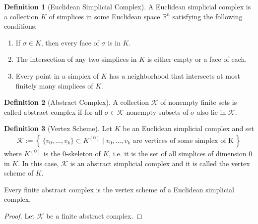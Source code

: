 \documentclass[a4paper]{book}
\theoremstyle{definition}
\newtheorem{definition}{Definition}[]
\newcommand{\makeset}[2]{\left\{\, #1 \mid #2 \,\right\}}
\begin{document}
\begin{defbox}
    \begin{definition}[Euclidean Simplicial Complex]
        A Euclidean simplicial complex is a collection \(K\) of simplices in some Euclidean space \(\mathbb{R}^n\) satisfying the following conditions:
        \begin{enumerate}
            \item If \(\sigma \in K\), then every face of \(\sigma\) is in \(K\).
            \item The intersection of any two simplices in \(K\) is either empty or a face of each.
            \item Every point in a simplex of \(K\) has a neighborhood that intersects at most finitely many simplices of \(K\).
        \end{enumerate}
    \end{definition}
\end{defbox}

\begin{defbox}
    \begin{definition}[Abstract Complex]
        A collection \(\mathcal{K}\) of nonempty finite sets is called abstract complex if for all \(\sigma \in \mathcal{K}\) nonempty subsets of \(\sigma\) also lie in \(\mathcal{K}\).
    \end{definition}
\end{defbox}

\begin{defbox}
    \begin{definition}[Vertex Scheme]
        Let \(K\) be an Euclidean simplicial complex and set
        \begin{align*}
            \mathcal{K} := \makeset{\{v_0, \ldots, v_k\} \subset K^{(0)}}{v_0, \ldots, v_k \text{ are vertices of some simplex of K}}
        \end{align*}
        where \(K^{(0)}\) is the \(0\)-skeleton of \(K\), i.e. it is the set of all simplices of dimension \(0\) in \(K\). In this case, \(\mathcal{K}\) is an abstract simplicial complex and it is called the vertex scheme of \(K\).
    \end{definition}
\end{defbox}

Every finite abstract complex is the vertex scheme of a Euclidean simplicial complex.

\begin{proof}
    Let \(\mathcal{K}\) be a finite abstract complex.
\end{proof}
\end{document}
